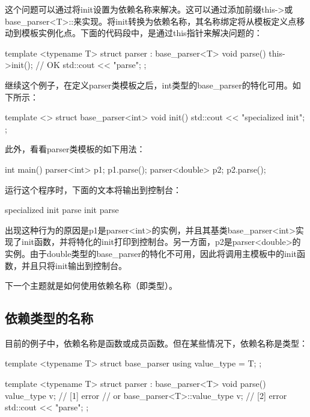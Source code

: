 这个问题可以通过将init设置为依赖名称来解决。这可以通过添加前缀this->或base_parser<T>::来实现。将init转换为依赖名称，其名称绑定将从模板定义点移动到模板实例化点。下面的代码段中，是通过this指针来解决问题的：

\begin{cppcode}
template <typename T>
struct parser : base_parser<T>
{
	void parse()
	{
		this->init(); // OK
		std::cout << "parse\n";
	}
};
\end{cppcode}

继续这个例子，在定义parser类模板之后，int类型的base_parser的特化可用。如下所示：

\begin{cppcode}
template <>
struct base_parser<int>
{
	void init()
	{
		std::cout << "specialized init\n";
	}
};
\end{cppcode}

此外，看看parser类模板的如下用法：

\begin{cppcode}
int main()
{
	parser<int> p1;
	p1.parse();
	parser<double> p2;
	p2.parse();
}
\end{cppcode}

运行这个程序时，下面的文本将输出到控制台：

\begin{cppcode}
specialized init
parse
init
parse
\end{cppcode}

出现这种行为的原因是p1是parser<int>的实例，并且其基类base_parser<int>实现了init函数，并将特化的init打印到控制台。另一方面，p2是parser<double>的实例。由于double类型的base_parser的特化不可用，因此将调用主模板中的init函数，并且只将init输出到控制台。

下一个主题就是如何使用依赖名称（即类型）。

\subsection{依赖类型的名称}

目前的例子中，依赖名称是函数或成员函数。但在某些情况下，依赖名称是类型：

\begin{cppcode}
template <typename T>
struct base_parser
{
	using value_type = T;
};

template <typename T>
struct parser : base_parser<T>
{
	void parse()
	{
		value_type v{}; // [1] error
		// or
		base_parser<T>::value_type v{}; // [2] error
		std::cout << "parse\n";
	}
};
\end{cppcode}


